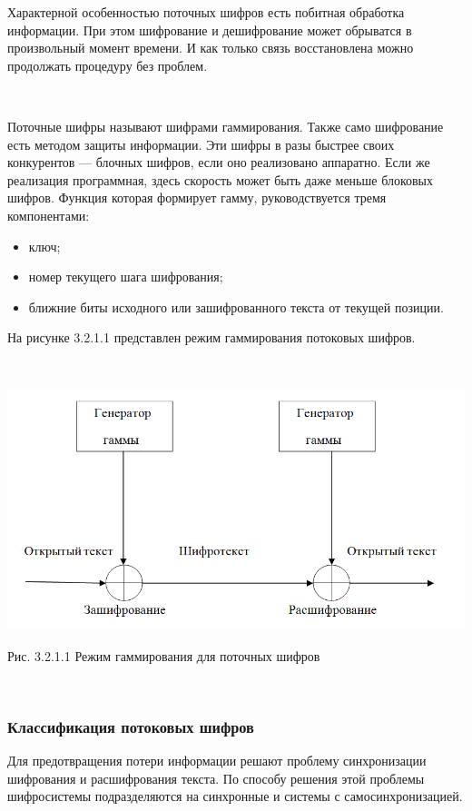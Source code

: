 \documentclass[a4paper]{report}
\begin{document}
Характерной особенностью поточных шифров есть побитная обработка информации. При этом шифрование и дешифрование может обрыватся в произвольный момент времени. И как только связь восстановлена можно продолжать процедуру без проблем.

~

Поточные шифры называют шифрами гаммирования. Также само шифрование есть методом защиты информации. Эти шифры в разы быстрее своих конкурентов — блочных шифров, если оно реализовано аппаратно. Если же реализация программная, здесь скорость может быть даже меньше блоковых шифров. Функция которая формирует гамму, руководствуется тремя компонентами: 

\begin{itemize}
\item ключ;
\item номер текущего шага шифрования;
\item ближние биты исходного или зашифрованного текста от текущей позиции.
\end{itemize}

\newpage
На рисунке 3.2.1.1 представлен режим гаммирования потоковых шифров.

~

\includegraphics[scale=0.5]{Gamma12}
{\centering\caption{\newline Рис. 3.2.1.1 Режим гаммирования для поточных шифров}\\}



\subsubsection{Классификация потоковых шифров}
Для предотвращения потери информации решают проблему синхронизации шифрования и расшифрования текста.
По способу решения этой проблемы шифросистемы подразделяются на синхронные и системы с самосинхронизацией.
\end{document}
